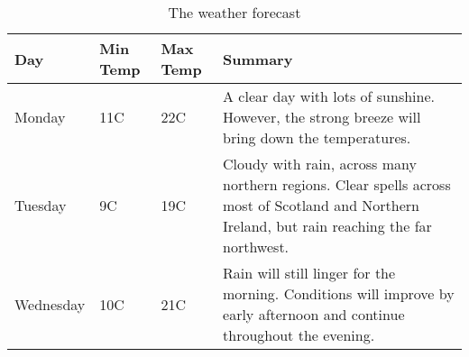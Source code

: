 \documentclass[%
project,    %
]{USN-MSc}
\begin{document}
\lipsum[4]

\begin{table}[!ht]
 \caption{The weather forecast}
  \centering
   \begin{tabular}{ | l | l | l | p{5cm} |}
    \hline
    Day & Min Temp & Max Temp & Summary \\ \hline
    Monday & 11C & 22C & A clear day with lots of sunshine.
    However, the strong breeze will bring down the temperatures. \\ \hline
    Tuesday & 9C & 19C & Cloudy with rain, across many northern regions. Clear spells
    across most of Scotland and Northern Ireland,
    but rain reaching the far northwest. \\ \hline
    Wednesday & 10C & 21C & Rain will still linger for the morning.
    Conditions will improve by early afternoon and continue
    throughout the evening. \\
    \hline
    \end{tabular}
\end{table}

~\nocite{*}

\cleardoublepage
\end{document}
